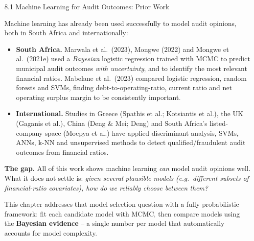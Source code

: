 \documentclass[aspectratio=169,10pt]{beamer}
\begin{document}
\begin{frame}[allowframebreaks]{8.1 Machine Learning for Audit Outcomes: Prior Work}

Machine learning has already been used successfully to model audit opinions, both in South Africa and internationally:

\begin{itemize}
  \item \textbf{South Africa.} Marwala et al.\ (2023), Mongwe (2022) and Mongwe et al.\ (2021e) used a \emph{Bayesian} logistic regression trained with MCMC to predict municipal audit outcomes \emph{with uncertainty}, and to identify the most relevant financial ratios. Mabelane et al.\ (2023) compared logistic regression, random forests and SVMs, finding debt-to-operating-ratio, current ratio and net operating surplus margin to be consistently important.
  \item \textbf{International.} Studies in Greece (Spathis et al.; Kotsiantis et al.), the UK (Gaganis et al.), China (Deng \& Mei; Deng) and South Africa's listed-company space (Moepya et al.) have applied discriminant analysis, SVMs, ANNs, k-NN and unsupervised methods to detect qualified/fraudulent audit outcomes from financial ratios.
\end{itemize}

\framebreak

\textbf{The gap.} All of this work shows machine learning \emph{can} model audit opinions well. What it does not settle is: \emph{given several plausible models (e.g.\ different subsets of financial-ratio covariates), how do we reliably choose between them?}

This chapter addresses that model-selection question with a fully probabilistic framework: fit each candidate model with MCMC, then compare models using the \textbf{Bayesian evidence} -- a single number per model that automatically accounts for model complexity.

\end{frame}
\end{document}
